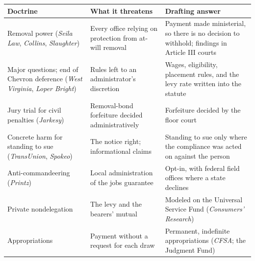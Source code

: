 \begingroup\small\renewcommand{\arraystretch}{1.12}
\begin{longtable}{@{}>{\raggedright\arraybackslash}p{}>{\raggedright\arraybackslash}p{}>{\raggedright\arraybackslash}p{}@{}}
\hline
\textbf{Doctrine} & \textbf{What it threatens} & \textbf{Drafting answer} \\
\hline
\endhead
Removal power (\emph{Seila Law}, \emph{Collins}, \emph{Slaughter}) & Every office relying on protection from at-will removal & Payment made ministerial, so there is no decision to withhold; findings in Article III courts \\ \hline
Major questions; end of Chevron deference (\emph{West Virginia}, \emph{Loper Bright}) & Rules left to an administrator's discretion & Wages, eligibility, placement rules, and the levy rate written into the statute \\ \hline
Jury trial for civil penalties (\emph{Jarkesy}) & Removal-bond forfeiture decided administratively & Forfeiture decided by the floor court \\ \hline
Concrete harm for standing to sue (\emph{TransUnion}, \emph{Spokeo}) & The notice right; informational claims & Standing to sue only where the compliance was acted on against the person \\ \hline
Anti-commandeering (\emph{Printz}) & Local administration of the jobs guarantee & Opt-in, with federal field offices where a state declines \\ \hline
Private nondelegation & The levy and the bearers' mutual & Modeled on the Universal Service Fund (\emph{Consumers' Research}) \\ \hline
Appropriations & Payment without a request for each draw & Permanent, indefinite appropriations (\emph{CFSA}; the Judgment Fund) \\ \hline
\end{longtable}
\endgroup



